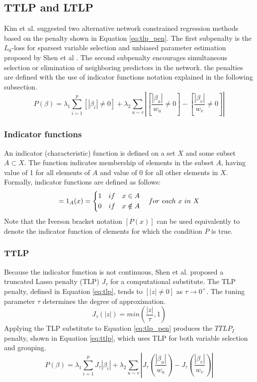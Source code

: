 \subsection{TTLP and LTLP}
Kim et al. \cite{kim2013network} suggested two alternative network constrained regression methods based on the penalty shown in Equation \ref{eq:tlp_pen}. The first subpenalty is the $L_0$-loss for sparsest variable selection and unbiased parameter estimation proposed by Shen et al \cite{shen2012likelihood}. The second subpenalty encourages simultaneous selection or elimination of neighboring predictors in the network. the penalties are defined with the use of indicator functions notation explained in the following subsection.
\begin{equation} \label{eq:tlp_pen}
P(\beta) = \lambda_1 \sum_{i=1}^{p} [|\beta_i|\neq 0] + \lambda_2 \sum_{u \sim v} \left|\left[\frac{|\beta_u|}{w_u}\neq 0\right]-\left[\frac{|\beta_v|}{w_v}\neq 0\right]\right|
\end{equation}

\subsubsection{Indicator functions}
An indicator (characteristic) function is defined on a set $X$ and some subset $A \subset X$. The function indicates membership of elements in the subset $A$, having value of 1 for all elements of $A$ and value of 0 for all other elements in $X$. Formally, indicator functions are defined as follows:
\begin{equation}
[x \in A] = 1_A (x) = \left\{ 
\begin{aligned} 
1 & \quad if \quad x \in A \cr 
0 & \quad if \quad x \notin A
\end{aligned} \right.
for\ each\ x\ in\ X
\end{equation}
Note that the Iverson bracket notation $[P(x)]$ can be used equivalently to denote the indicator function of elements for which the condition $P$ is true.

\subsubsection{TTLP} \label{sec:ttlp}
Because the indicator function is not continuous, Shen et al. \cite{shen2012likelihood} proposed a truncated Lasso penalty (TLP) $J_\tau$ for a computational substitute. The TLP penalty, defined in Equation \ref{eq:tlp}, tends to $[|z|\neq 0]$ as $\tau \to 0^+$. The tuning parameter $\tau$ determines the degree of approximation.
\begin{equation} \label{eq:tlp}
J_\tau(|z|)=min\left(\frac{|z|}{\tau},1\right)
\end{equation}
Applying the TLP substitute to Equation \ref{eq:tlp_pen} produces the $TTLP_I$ penalty, shown in Equation \ref{eq:ttlp}, which uses TLP for both variable selection and grouping.
\begin{equation} \label{eq:ttlp}
P(\beta) = \lambda_1 \sum_{i=1}^{p} J_\tau|\beta_i| + \lambda_2 \sum_{u \sim v} \left|J_\tau\left(\frac{|\beta_u|}{w_u}\right)-J_\tau\left(\frac{|\beta_v|}{w_v}\right)\right|
\end{equation}

